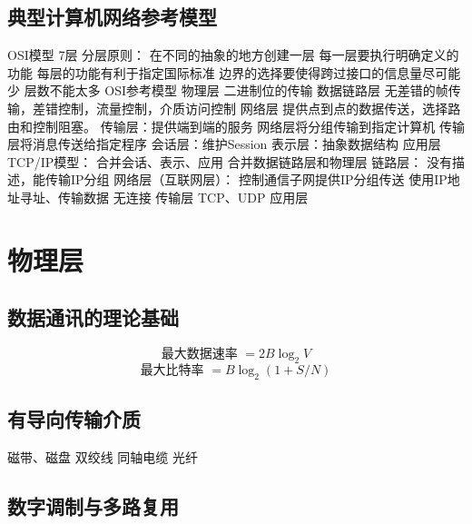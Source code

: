 \documentclass{ctexart}
\begin{document}
\subsection{典型计算机网络参考模型}
\begin{outline}
    \1 OSI模型 7层
        \2 分层原则：
            \3 在不同的抽象的地方创建一层
            \3 每一层要执行明确定义的功能
            \3 每层的功能有利于指定国际标准
            \3 边界的选择要使得跨过接口的信息量尽可能少
            \3 层数不能太多
        \2 OSI参考模型
            \3 物理层
                \4 二进制位的传输
            \3 数据链路层
                \4 无差错的帧传输，差错控制，流量控制，介质访问控制
            \3 网络层
                \4 提供点到点的数据传送，选择路由和控制阻塞。
            \3 传输层：提供端到端的服务
                \4 网络层将分组传输到指定计算机
                \4 传输层将消息传送给指定程序
            \3 会话层：维护Session
            \3 表示层：抽象数据结构
            \3 应用层
    \1 TCP/IP模型：
        \2 合并会话、表示、应用
        \2 合并数据链路层和物理层
        \2 链路层：
            \3 没有描述，能传输IP分组
        \2 网络层（互联网层）：
            \3 控制通信子网提供IP分组传送
            \3 使用IP地址寻址、传输数据
            \3 无连接
        \2 传输层
            \3 TCP、UDP
        \2 应用层
\end{outline}
\section{物理层}
\subsection{数据通讯的理论基础}
\begin{equation*}
    \text{最大数据速率 } = 2B \log_2 V
\end{equation*}
\begin{equation*}
    \text{最大比特率 } = B \log_2 (1 + S/N)
\end{equation*}
\subsection{有导向传输介质}
\begin{outline}
    \1 磁带、磁盘
    \1 双绞线
    \1 同轴电缆
    \1 光纤
\end{outline}
\subsection{数字调制与多路复用}
\end{document}
